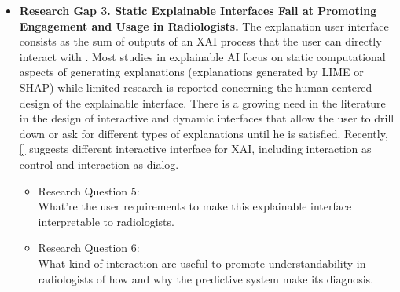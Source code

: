 \begin{itemize}
    \item \textbf{\underline{Research Gap 3.} Static Explainable Interfaces Fail at Promoting Engagement and Usage in Radiologists.} The explanation user interface consists as the sum of outputs of an XAI process that the user can directly interact with \citep{Chromik2021}. Most studies in explainable AI focus on static computational aspects of generating explanations (explanations generated by LIME or SHAP) while limited research is reported concerning the human-centered design of the explainable interface. There is a growing need in the literature in the design of interactive and dynamic interfaces that allow the user to drill down or ask for different types of explanations until he is satisfied. Recently, \ref{} suggests different interactive interface for XAI, including interaction as control and interaction as dialog. %

          \begin{itemize}
              \item Research Question 5: \\ What're the user requirements to make this explainable interface interpretable to radiologists.
              \item Research Question 6: \\ What kind of interaction are useful to promote understandability in radiologists of how and why the predictive system make its diagnosis.
          \end{itemize}
\end{itemize}





